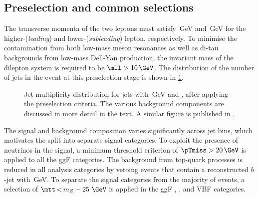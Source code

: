 \subsection{Preselection and common selections}
\label{subsec:preselection}
The transverse momenta of the two leptons must satisfy \,GeV and \,GeV for the higher-\pT (\emph{leading}) and lower-\pT (\emph{subleading}) lepton, respectively.
To minimise the contamination from both low-mass meson resonances as well as di-tau backgrounds from low-mass Dell-Yan production, the invariant mass of the dilepton system is required to be $\mll > 10\,\GeV$.
The distribution of the number of jets in the event at this preselection stage is shown in \cref{fig:njet-dist}.
\begin{figure}
  \caption{Jet multiplicity distribution for jets with \,GeV and , after applying the preselection criteria. The various background components are discussed in more detail in the text. A similar figure is published in .}
  \label{fig:njet-dist}
\end{figure}
The signal and background composition varies significantly across jet bins, which motivates the split into separate \Njet signal categories.
To exploit the presence of neutrinos in the signal, a minimum threshold criterion of $\pTmiss > 20\,\GeV$ is applied to all the ggF categories.
The background from top-quark processes is reduced in all analysis categories by vetoing events that contain a reconstructed $b$-jet with \,GeV.
To separate the signal categories from the majority of \Zgamma events, a selection of $\mtt\,{<}\,m_Z - 25~\GeV$ is applied in the ggF \OneJet, \TwoJet, and VBF \TwoJet categories.



